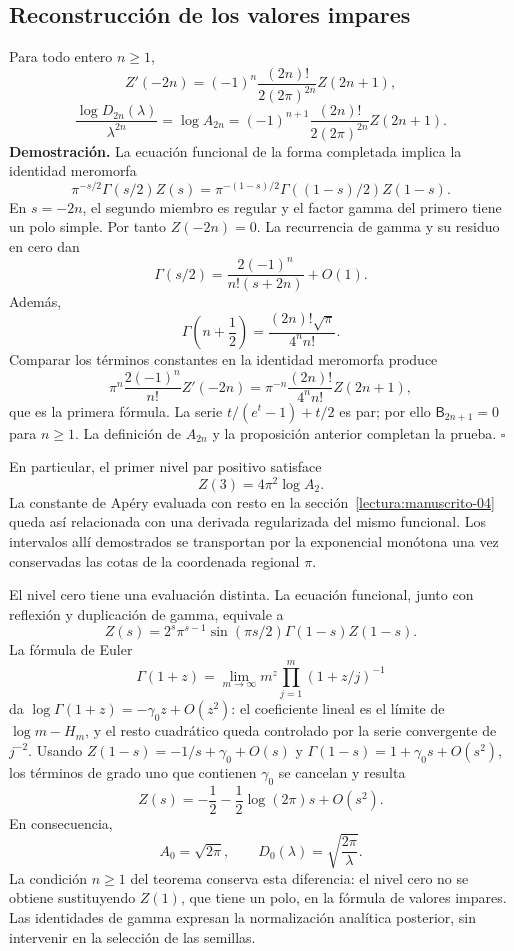 \subsection{Reconstrucción de los valores impares}
Para todo entero $n\geq1$,
\[
 Z'(-2n)=(-1)^n\frac{(2n)!}{2(2\pi)^{2n}}Z(2n+1),
\]
\[
 \frac{\log D_{2n}(\lambda)}{\lambda^{2n}}
 =\log A_{2n}
 =(-1)^{n+1}\frac{(2n)!}{2(2\pi)^{2n}}Z(2n+1).
\]
\textbf{Demostración.} La ecuación funcional de la forma completada
implica la identidad meromorfa
\[
 \pi^{-s/2}\Gamma(s/2)Z(s)
 =\pi^{-(1-s)/2}\Gamma((1-s)/2)Z(1-s).
\]
En $s=-2n$, el segundo miembro es regular y el factor gamma del
primero tiene un polo simple. Por tanto $Z(-2n)=0$. La recurrencia
de gamma y su residuo en cero dan
\[
 \Gamma(s/2)=\frac{2(-1)^n}{n!(s+2n)}+O(1).
\]
Además,
\[
 \Gamma\!\left(n+\frac12\right)
 =\frac{(2n)!\sqrt\pi}{4^nn!}.
\]
Comparar los términos constantes en la identidad meromorfa produce
\[
 \pi^n\frac{2(-1)^n}{n!}Z'(-2n)
 =\pi^{-n}\frac{(2n)!}{4^nn!}Z(2n+1),
\]
que es la primera fórmula. La serie
$t/(e^t-1)+t/2$ es par; por ello $\mathsf B_{2n+1}=0$ para
$n\geq1$. La definición de $A_{2n}$ y la proposición anterior
completan la prueba. \hfill$\square$

En particular, el primer nivel par positivo satisface
\[
 Z(3)=4\pi^2\log A_2.
\]
La constante de Apéry evaluada con resto en la
sección~\ref{lectura:manuscrito-04} queda así relacionada con una
derivada regularizada del mismo funcional. Los intervalos allí
demostrados se transportan por la exponencial monótona una vez
conservadas las cotas de la coordenada regional $\pi$.

El nivel cero tiene una evaluación distinta. La ecuación funcional,
junto con reflexión y duplicación de gamma, equivale a
\[
 Z(s)=2^s\pi^{s-1}\sin(\pi s/2)\Gamma(1-s)Z(1-s).
\]
La fórmula de Euler
\[
 \Gamma(1+z)=\lim_{m\to\infty}
 m^z\prod_{j=1}^{m}(1+z/j)^{-1}
\]
da $\log\Gamma(1+z)=-\gamma_0z+O(z^2)$: el coeficiente lineal es
el límite de $\log m-H_m$, y el resto cuadrático queda controlado
por la serie convergente de $j^{-2}$. Usando
$Z(1-s)=-1/s+\gamma_0+O(s)$ y
$\Gamma(1-s)=1+\gamma_0s+O(s^2)$, los términos de grado uno
que contienen $\gamma_0$ se cancelan y resulta
\[
 Z(s)=-\frac12-\frac12\log(2\pi)s+O(s^2).
\]
En consecuencia,
\[
 A_0=\sqrt{2\pi},\qquad D_0(\lambda)=\sqrt{\frac{2\pi}{\lambda}}.
\]
La condición $n\geq1$ del teorema conserva esta diferencia: el nivel
cero no se obtiene sustituyendo $Z(1)$, que tiene un polo, en la fórmula
de valores impares. Las identidades de gamma expresan la normalización
analítica posterior, sin intervenir en la selección de las semillas.
